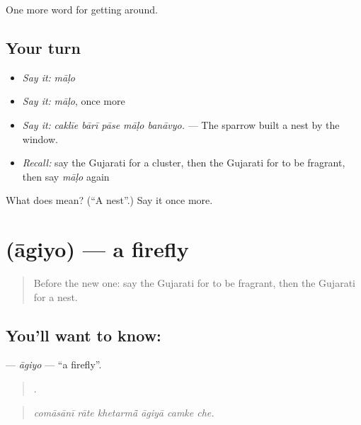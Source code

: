 \begin{grammarlens}[title={What you've built}]
One more word for getting around.
\end{grammarlens}

\subsection*{Your turn}
\begin{itemize}
\raggedright
  \item \emph{Say it:} \emph{māḷo}
  \item \emph{Say it:} \emph{māḷo}, once more
  \item \emph{Say it:} \emph{caklīe bārī pāse māḷo banāvyo.} — The sparrow built a nest by the window.
  \item \emph{Recall:} say the Gujarati for a cluster, then the Gujarati for to be fragrant, then say \emph{māḷo} again
\end{itemize}

\begin{tcolorbox}[breakable,colback=teal!4,colframe=teal!35!black,title={Before you move on}]
What does  mean? (\textquotedblleft{}A nest\textquotedblright{}.) Say it once more.
\end{tcolorbox}
\section[\texorpdfstring{\gu{આગિયો} (āgiyo)}{આગિયો (āgiyo)}]{ (āgiyo) — a firefly}

\label{lesson:GU-C445-agiyo}



\begin{quote}
Before the new one: say the Gujarati for to be fragrant, then the Gujarati for a nest.
\end{quote}

\subsection*{You'll want to know: }
\textbf{} — \emph{āgiyo} — \textquotedblleft{}a firefly\textquotedblright{}.

\begin{quote}
     .
\end{quote}

\begin{quote}
\emph{comāsānī rāte khetarmā̃ āgiyā camke che.}
\end{quote}

